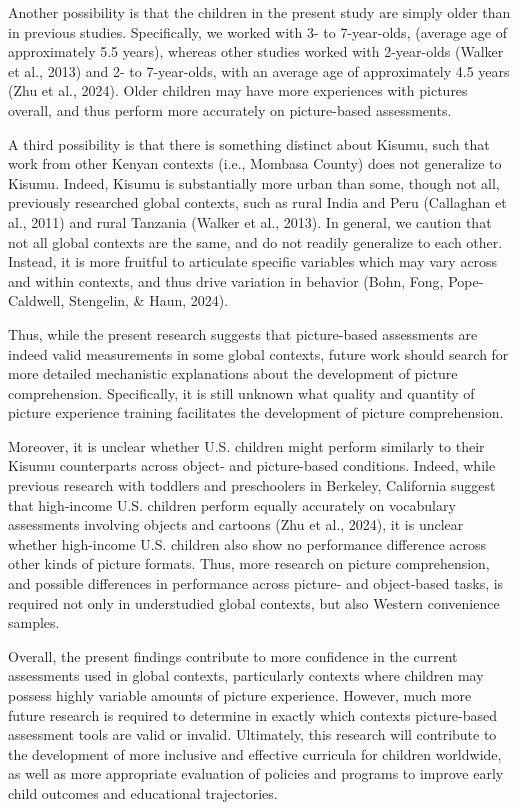 \documentclass[10pt, letterpaper]{article}
\begin{document}
Another possibility is that the children in the present study are simply
older than in previous studies. Specifically, we worked with 3- to
7-year-olds, (average age of approximately 5.5 years), whereas other
studies worked with 2-year-olds (Walker et al., 2013) and 2- to
7-year-olds, with an average age of approximately 4.5 years (Zhu et al.,
2024). Older children may have more experiences with pictures overall,
and thus perform more accurately on picture-based assessments.

A third possibility is that there is something distinct about Kisumu,
such that work from other Kenyan contexts (i.e., Mombasa County) does
not generalize to Kisumu. Indeed, Kisumu is substantially more urban
than some, though not all, previously researched global contexts, such
as rural India and Peru (Callaghan et al., 2011) and rural Tanzania
(Walker et al., 2013). In general, we caution that not all global
contexts are the same, and do not readily generalize to each other.
Instead, it is more fruitful to articulate specific variables which may
vary across and within contexts, and thus drive variation in behavior
(Bohn, Fong, Pope-Caldwell, Stengelin, \& Haun, 2024).

Thus, while the present research suggests that picture-based assessments
are indeed valid measurements in some global contexts, future work
should search for more detailed mechanistic explanations about the
development of picture comprehension. Specifically, it is still unknown
what quality and quantity of picture experience training facilitates the
development of picture comprehension.

Moreover, it is unclear whether U.S. children might perform similarly to
their Kisumu counterparts across object- and picture-based conditions.
Indeed, while previous research with toddlers and preschoolers in
Berkeley, California suggest that high-income U.S. children perform
equally accurately on vocabulary assessments involving objects and
cartoons (Zhu et al., 2024), it is unclear whether high-income U.S.
children also show no performance difference across other kinds of
picture formats. Thus, more research on picture comprehension, and
possible differences in performance across picture- and object-based
tasks, is required not only in understudied global contexts, but also
Western convenience samples.

Overall, the present findings contribute to more confidence in the
current assessments used in global contexts, particularly contexts where
children may possess highly variable amounts of picture experience.
However, much more future research is required to determine in exactly
which contexts picture-based assessment tools are valid or invalid.
Ultimately, this research will contribute to the development of more
inclusive and effective curricula for children worldwide, as well as
more appropriate evaluation of policies and programs to improve early
child outcomes and educational trajectories.
\end{document}
